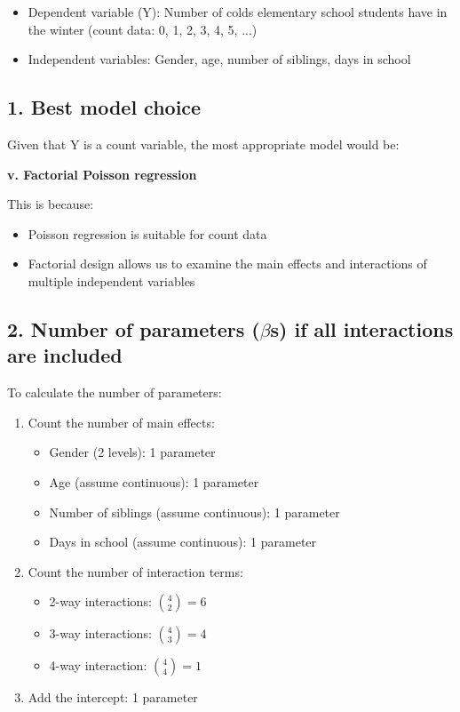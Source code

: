\documentclass{article}
\begin{document}
\begin{itemize}
    \item Dependent variable (Y): Number of colds elementary school students have in the winter (count data: 0, 1, 2, 3, 4, 5, ...)
    \item Independent variables: Gender, age, number of siblings, days in school
\end{itemize}

\subsection*{1. Best model choice}

Given that Y is a count variable, the most appropriate model would be:

\textbf{v. Factorial Poisson regression}

This is because:
\begin{itemize}
    \item Poisson regression is suitable for count data
    \item Factorial design allows us to examine the main effects and interactions of multiple independent variables
\end{itemize}

\subsection*{2. Number of parameters ($\beta$s) if all interactions are included}

To calculate the number of parameters:

\begin{enumerate}
    \item Count the number of main effects:
    \begin{itemize}
        \item Gender (2 levels): 1 parameter
        \item Age (assume continuous): 1 parameter
        \item Number of siblings (assume continuous): 1 parameter
        \item Days in school (assume continuous): 1 parameter
    \end{itemize}
    
    \item Count the number of interaction terms:
    \begin{itemize}
        \item 2-way interactions: $\binom{4}{2} = 6$
        \item 3-way interactions: $\binom{4}{3} = 4$
        \item 4-way interaction: $\binom{4}{4} = 1$
    \end{itemize}
    
    \item Add the intercept: 1 parameter
\end{enumerate}
\end{document}
